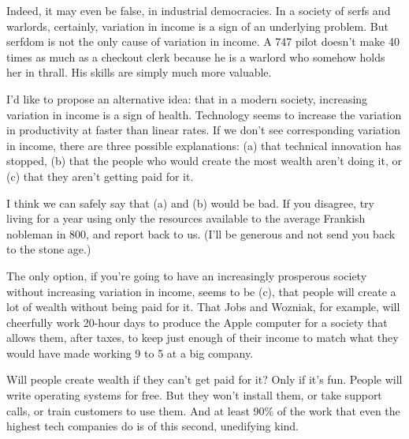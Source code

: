 Indeed, it may even be false, in industrial
                  democracies. In a society of serfs and warlords, certainly,
                  variation in income is a sign of an underlying problem. But
                  serfdom is not the only cause of variation in income. A 747
                  pilot doesn't make 40 times as much as a checkout clerk
                  because he is a warlord who somehow holds her in thrall. His
                  skills are simply much more valuable.

I'd like to
                  propose an alternative idea: that in a modern society,
                  increasing variation in income is a sign of health. Technology
                  seems to increase the variation in productivity at faster than
                  linear rates. If we don't see corresponding variation in
                  income, there are three possible explanations: (a) that
                  technical innovation has stopped, (b) that the people who
                  would create the most wealth aren't doing it, or (c) that they
                  aren't getting paid for it.

I think we can safely
                  say that (a) and (b) would be bad. If you disagree, try living
                  for a year using only the resources available to the average
                  Frankish nobleman in 800, and report back to us. (I'll be
                  generous and not send you back to the stone age.)

The
                  only option, if you're going to have an increasingly
                  prosperous society without increasing variation in income,
                  seems to be (c), that people will create a lot of wealth
                  without being paid for it. That Jobs and Wozniak, for example,
                  will cheerfully work 20-hour days to produce the Apple
                  computer for a society that allows them, after taxes, to keep
                  just enough of their income to match what they would have made
                  working 9 to 5 at a big company.

Will people create
                  wealth if they can't get paid for it? Only if it's fun. People
                  will write operating systems for free. But they won't install
                  them, or take support calls, or train customers to use them.
                  And at least 90\% of the work that even the highest tech
                  companies do is of this second, unedifying kind.

